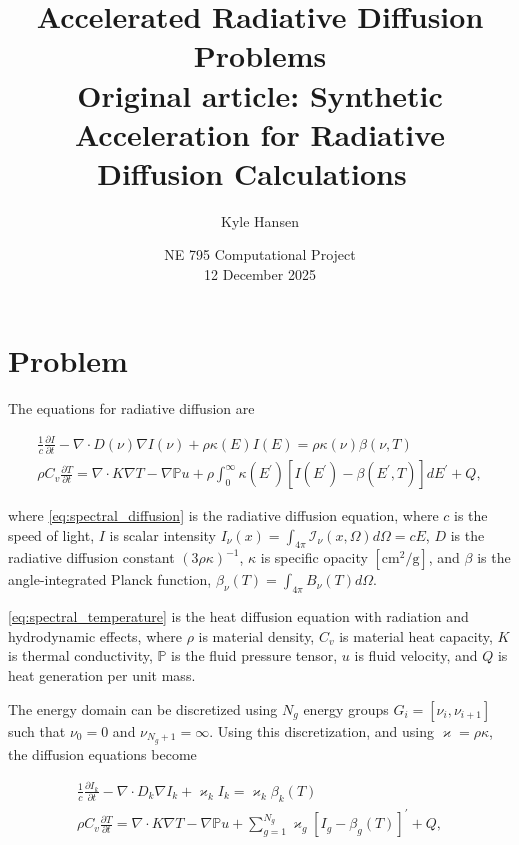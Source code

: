 \documentclass{template}
\title{Accelerated Radiative Diffusion Problems\\
\normalsize Original article: Synthetic Acceleration for Radiative Diffusion Calculations~\cite{morel1985synthetic}}
\author{Kyle Hansen}
\date{NE 795 Computational Project\\
12 December 2025}
\newcommand{\I}{\mathcal{I}}
\begin{document}
\maketitle

\section{Problem}

The equations for radiative diffusion are 

\begin{subequations}\label{eq:radiative-diffusion}
    \begin{gather}
    \label{eq:spectral_diffusion}
  \frac{1}{c}\frac{\partial I}{\partial t} - \nabla \cdot D(\nu) \nabla I(\nu) + \rho \kappa(E)I(E) = \rho\kappa(\nu)\beta(\nu, T)\\
  \label{eq:spectral_temperature}
  \rho C_v \frac{\partial T}{\partial t} = \nabla \cdot K \nabla T - \nabla {\mathbb{P}u} + \rho \int_0^\infty \kappa(E^\prime)\left[ I(E^\prime) - \beta(E^\prime, T) \right] dE^\prime + Q,
\end{gather}
\end{subequations}


where \autoref{eq:spectral_diffusion} is the radiative diffusion equation, where $c$ is the speed of light, $I$ is scalar intensity $I_{\nu}(x) = \int_{4\pi} \I_\nu(x,\Omega) d\Omega = cE$, $D$ is the radiative diffusion constant $(3\rho\kappa)^{-1}$, $\kappa$ is specific opacity $[\text{cm}^2/\text{g}]$, and $\beta$ is the angle-integrated Planck function, $\beta_\nu(T) = \int_{4\pi} B_\nu(T)d\Omega$.

\autoref{eq:spectral_temperature} is the heat diffusion equation with radiation and hydrodynamic effects, where $\rho$ is material density, $C_v$ is material heat capacity, $K$ is thermal conductivity, $\mathbb{P}$ is the fluid pressure tensor, $u$ is fluid velocity, and $Q$ is heat generation per unit mass.

The energy domain can be discretized using $N_g$ energy groups $G_i = [\nu_{i}, \nu_{i+1}]$ such that $\nu_0 = 0$ and $\nu_{N_g + 1} = \infty$. Using this discretization, and using $\varkappa = \rho\kappa$, the diffusion equations become

\begin{subequations}
    \begin{gather}
  \frac{1}{c}\frac{\partial I_k}{\partial t} - \nabla \cdot D_k \nabla I_k + \varkappa_k I_k = \varkappa_k \beta_k(T)\\
  \rho C_v \frac{\partial T}{\partial t} = \nabla \cdot K \nabla T - \nabla {\mathbb{P}u} +  \sum_{g=1}^{N_g} \varkappa_g\left[ I_g - \beta_g(T) \right]^\prime + Q,
\end{gather}
\end{subequations}
\end{document}
